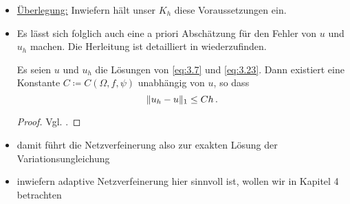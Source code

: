 \begin{itemize}
\begin{proof}
(iii) \underline{starke Konvergenz:} Aus der Koerzivität von $a$ folgt
\begin{align}\label{eq:3.28}
	\begin{aligned}
		0 &\le \alpha \, \norm{u_h-u}_H^2 \le a(u_h-u,u_h-u) \\
		& \le a(u_h,u_h)-a(u_h,u)-a(u,u_h)+a(u,u) \, ,
	\end{aligned}
\end{align}
wobei $u_h$ Lösung vom approximierten Problem \eqref{eq:3.23} und $u$ Lösung vom exakten Problem \eqref{eq:3.7} ist. Es sei $v \in W$ mit $I_h v = v_h \in K_h$, dann folgt aus \eqref{eq:3.23}
\begin{align}\label{eq:3.29}
	a(u_h,u_h) \le a(u_h,I_h v) - F(I_h v-u_h) \quad \forall \, v \in W \, .
\end{align}
Da $u_h \rightharpoonup u$ in $H$ und $I_h v \ra v$ in $H$ für $h \ra 0$, folgt aus \eqref{eq:3.28} und \eqref{eq:3.29} unter Verwendung von Voraussetzungen (ii)
\begin{align}\label{eq:3.30}
	0 \le \alpha \lim_{h\ra 0} \norm{u_h-u}^2_H \le a(u,v-u)-F(v-u) \quad \forall \, v \in W \, .
\end{align}
Da $a$ und $F$ stetig sind und $W$ dicht in $K$ liegt, gilt \eqref{eq:3.30} auch für alle $v \in K$. Setzen wir dann also $v = u$ in \eqref{eq:3.30}, dann folgt die Behauptung $\lim_{h\ra 0} \norm{u_h - u }_H^2 = 0$. 
\end{proof}

\item \underline{Überlegung:} Inwiefern hält unser $K_h$ diese Voraussetzungen ein.

\item Es lässt sich folglich auch eine a priori Abschätzung für den Fehler von $u$ und $u_h$ machen. Die Herleitung ist detailliert in \cite{Falk} wiederzufinden.
\begin{theorem}
Es seien $u$ und $u_h$ die Lösungen von \eqref{eq:3.7} und \eqref{eq:3.23}. Dann existiert eine Konstante $C \coloneqq C(\Omega, f, \psi)$ unabhängig von $u$, so dass
\[
	\lVert u_h-u\rVert_1 \le C h \, .
\]
\end{theorem}

\begin{proof}
Vgl. \cite{Falk}.
\end{proof}

\item damit führt die Netzverfeinerung also zur exakten Lösung der Variationsungleichung

\item inwiefern adaptive Netzverfeinerung hier sinnvoll ist, wollen wir in Kapitel 4 betrachten
\end{itemize}







